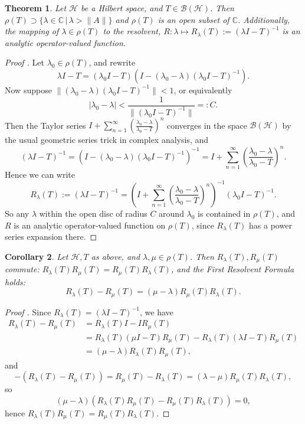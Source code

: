 \documentclass[12pt,oneside]{report}
\newtheorem{thm}{Theorem}[chapter]
\newtheorem{cor}[thm]{Corollary}
\begin{document}
\begin{thm}\label{resolvent-analytic}
    Let $\mathscr{H}$ be a Hilbert space, and $T \in \mathscr{B}(\mathscr{H})$. Then $\rho(T) \supset \{ \lambda \in \mathbb{C} \, | \, \lambda > \|A\| \}$ and $\rho(T)$ is an open subset of $\mathbb{C}$. Additionally, the mapping of $\lambda \in \rho(T)$ to the resolvent, $R: \lambda \mapsto R_\lambda(T) := (\lambda I - T)^{-1}$ is an analytic operator-valued function.
\end{thm}
\begin{proof}[Proof \cite{Reed_Simon_1980} \cite{Hunter_Nachtergaele_2007}]
    Let $\lambda_{0} \in \rho(T)$, and rewrite $$\lambda I - T = (\lambda_{0}I - T)(I - (\lambda_{0} - \lambda)(\lambda_{0}I - T)^{-1}).$$ Now suppose $\|(\lambda_{0} - \lambda)(\lambda_{0}I - T)^{-1}\| < 1$, or equivalently $$|\lambda_{0}-\lambda| < \frac{1}{\|(\lambda_{0}I - T)^{-1}\|} =: C.$$ Then the Taylor series $I + \sum_{n=1}^{\infty}\left(\frac{\lambda_{0}-\lambda}{\lambda_{0}-T}\right)^{n}$ converges in the space $\mathscr{B}(\mathscr{H})$ by the usual geometric series trick in complex analysis, and $$(\lambda I - T)^{-1} = (I - (\lambda_{0} - \lambda)(\lambda_{0} I - T)^{-1})^{-1} = I + \sum_{n=1}^{\infty}\left(\frac{\lambda_{0}-\lambda}{\lambda_{0}-T}\right)^{n}.$$ Hence we can write $$R_{\lambda}(T) := (\lambda I - T)^{-1} = \left(I + \sum_{n=1}^{\infty}\left(\frac{\lambda_{0}-\lambda}{\lambda_{0}-T}\right)^{n}\right)^{-1}(\lambda_{0}I - T)^{-1}.$$ So any $\lambda$ within the open disc of radius $C$ around $\lambda_{0}$ is contained in $\rho(T)$, and $R$ is an analytic operator-valued function on $\rho(T)$, since $R_{\lambda}(T)$ has a power series expansion there.
\end{proof}

\begin{cor}\label{first-resolvent-formula}
    Let $\mathscr{H}, T$ as above, and $\lambda,\mu \in \rho(T)$. Then $R_{\lambda}(T), R_{\mu}(T)$ commute: $R_{\lambda}(T)R_{\mu}(T) = R_{\mu}(T)R_{\lambda}(T)$, and the First Resolvent Formula holds: $$R_{\lambda}(T) - R_{\mu}(T) = (\mu - \lambda)R_{\mu}(T)R_{\lambda}(T).$$
\end{cor}
\begin{proof}[Proof \cite{Reed_Simon_1980}]
    Since $R_{\lambda}(T) = (\lambda I - T)^{-1}$,  we have 
\begin{align*}
R_{\lambda}(T) - R_{\mu}(T) &= R_{\lambda}(T)I - IR_{\mu}(T) \\
&= R_{\lambda}(T)(\mu I - T)R_{\mu}(T) - R_{\lambda}(T)(\lambda I - T)R_{\mu}(T) \\
&= (\mu-\lambda)R_{\lambda}(T)R_{\mu}(T),
\end{align*} and $$- (R_{\lambda}(T) - R_{\mu}(T)) = R_{\mu}(T) - R_{\lambda}(T) = (\lambda-\mu)R_{\mu}(T)R_{\lambda}(T),$$ so $$(\mu - \lambda)(R_{\lambda}(T)R_{\mu}(T) - R_{\mu}(T)R_{\lambda}(T)) = 0,$$ hence $R_{\lambda}(T)R_{\mu}(T) = R_{\mu}(T)R_{\lambda}(T)$.
\end{proof}
\end{document}
